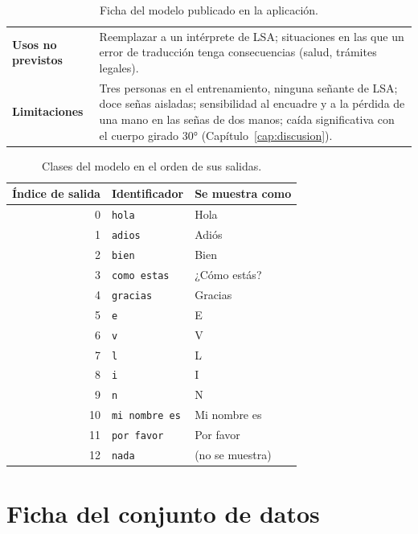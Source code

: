 \begin{table}[h]
\begin{tabular}{p{4cm}p{10cm}}
        \textbf{Usos no previstos} & Reemplazar a un intérprete de LSA; situaciones en las que un error de traducción tenga consecuencias (salud, trámites legales). \\
        \textbf{Limitaciones} & Tres personas en el entrenamiento, ninguna señante de LSA; doce señas aisladas; sensibilidad al encuadre y a la pérdida de una mano en las señas de dos manos; caída significativa con el cuerpo girado 30° (Capítulo~\ref{cap:discusion}). \\
        \bottomrule
    \end{tabular}
    \caption{Ficha del modelo publicado en la aplicación.}
    \label{tab:ficha-modelo}
\end{table}

\begin{table}[h]
    \centering
    \begin{tabular}{rll}
        \toprule
        Índice de salida & Identificador & Se muestra como \\
        \midrule
        0 & \texttt{hola} & Hola \\
        1 & \texttt{adios} & Adiós \\
        2 & \texttt{bien} & Bien \\
        3 & \texttt{como estas} & ¿Cómo estás? \\
        4 & \texttt{gracias} & Gracias \\
        5 & \texttt{e} & E \\
        6 & \texttt{v} & V \\
        7 & \texttt{l} & L \\
        8 & \texttt{i} & I \\
        9 & \texttt{n} & N \\
        10 & \texttt{mi nombre es} & Mi nombre es \\
        11 & \texttt{por favor} & Por favor \\
        12 & \texttt{nada} & (no se muestra) \\
        \bottomrule
    \end{tabular}
    \caption{Clases del modelo en el orden de sus salidas.}
    \label{tab:clases}
\end{table}

\chapter{Ficha del conjunto de datos}
\label{ap:ficha-datos}

